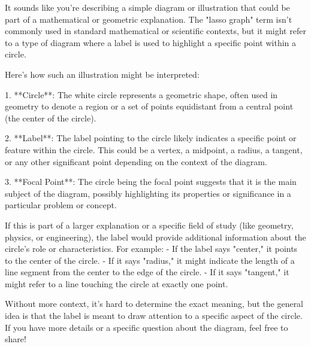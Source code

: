 It sounds like you're describing a simple diagram or illustration that could be part of a mathematical or geometric explanation. The "lasso graph" term isn't commonly used in standard mathematical or scientific contexts, but it might refer to a type of diagram where a label is used to highlight a specific point within a circle.

Here's how such an illustration might be interpreted:

1. **Circle**: The white circle represents a geometric shape, often used in geometry to denote a region or a set of points equidistant from a central point (the center of the circle).

2. **Label**: The label pointing to the circle likely indicates a specific point or feature within the circle. This could be a vertex, a midpoint, a radius, a tangent, or any other significant point depending on the context of the diagram.

3. **Focal Point**: The circle being the focal point suggests that it is the main subject of the diagram, possibly highlighting its properties or significance in a particular problem or concept.

If this is part of a larger explanation or a specific field of study (like geometry, physics, or engineering), the label would provide additional information about the circle's role or characteristics. For example:
- If the label says "center," it points to the center of the circle.
- If it says "radius," it might indicate the length of a line segment from the center to the edge of the circle.
- If it says "tangent," it might refer to a line touching the circle at exactly one point.

Without more context, it’s hard to determine the exact meaning, but the general idea is that the label is meant to draw attention to a specific aspect of the circle. If you have more details or a specific question about the diagram, feel free to share!